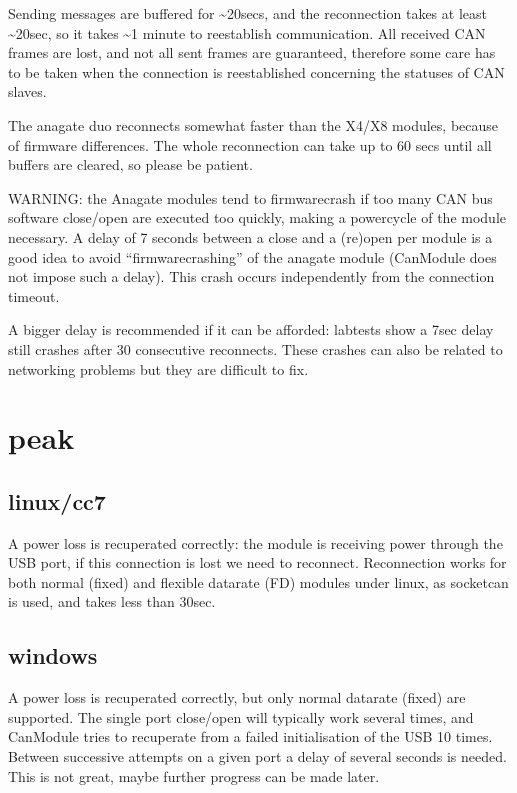 \documentclass[a4paper,10pt,english]{sphinxmanual}
\begin{document}
Sending messages are buffered for \textasciitilde{}20secs, and the reconnection
takes at least \textasciitilde{}20sec, so it takes \textasciitilde{}1 minute to reestablish communication. All received CAN frames
are lost, and not all sent frames are guaranteed, therefore some care has to be taken when the
connection is reestablished concerning the statuses of CAN slaves.

The anagate duo reconnects somewhat faster than the X4/X8 modules, because of firmware differences.
The whole reconnection can take up to 60 secs until all buffers are cleared, so please be patient.

WARNING: the Anagate modules tend to firmware\sphinxhyphen{}crash if too many CAN bus software close/open are
executed too quickly, making a power\sphinxhyphen{}cycle of the module necessary. A delay of 7 seconds
between a close and a (re\sphinxhyphen{})open per module is a good idea to avoid
“firmware\sphinxhyphen{}crashing” of the anagate module (CanModule does not impose such a delay).
This crash occurs independently from the connection timeout.

A bigger delay is recommended if it can be afforded: lab\sphinxhyphen{}tests show a 7sec delay still crashes
after 30 consecutive reconnects. These crashes can also be related to networking problems but
they are difficult to fix.


\section{peak}
\label{\detokenize{reconnection:peak}}

\subsection{linux/cc7}
\label{\detokenize{reconnection:linux-cc7}}
A power loss is recuperated correctly: the module is receiving power through the USB port,
if this connection is lost we need to reconnect. Reconnection works for both normal (fixed)
and flexible datarate (FD) modules under linux, as socketcan is used, and takes less than 30sec.


\subsection{windows}
\label{\detokenize{reconnection:windows}}
A power loss is recuperated correctly, but only normal datarate (fixed) are supported.
The single port close/open will typically work several times, and CanModule tries to
recuperate from a failed initialisation of the USB 10 times. Between successive attempts on a
given port a delay of several seconds is needed. This is not great, maybe further progress
can be made later.
\end{document}
